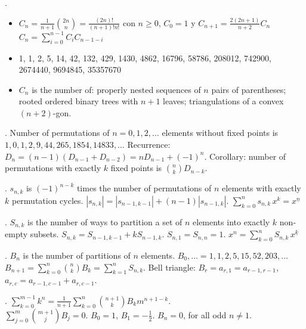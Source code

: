 .
\begin{itemize}
    \item $C_n = \frac{1}{n+1} \binom{2n}{n} = \frac{(2n)!}{(n+1)!n!}$ con $n \geq 0$, $C_0 = 1$ y $C_{n+1} = \frac{2(2n + 1)}{n + 2} C_{n}$
$C_n=\sum_{i=0}^{n-1} C_i C_{n-1-i}$    
\item 1, 1, 2, 5, 14, 42, 132, 429, 1430, 4862, 16796, 58786, 208012, 742900, 2674440, 9694845, 35357670
 \item $C_n$ is the number of:
properly nested sequences of $n$ pairs of parentheses;
rooted ordered binary trees with $n+1$ leaves;
triangulations of a convex $(n+2)$-gon.

\end{itemize}

.
Number of permutations of $n=0,1,2,\dots$ elements without fixed points is
$1, 0, 1, 2, 9, 44, 265, 1854, 14833, \dots$
Recurrence: $D_n = (n-1)(D_{n-1} + D_{n-2}) = n D_{n-1} + (-1)^n$.
Corollary: number of permutations with exactly $k$ fixed points is ${n \choose k} D_{n-k}$.

.
$s_{n,k}$ is $(-1)^{n-k}$ times the number of permutations of $n$ elements with
exactly $k$ permutation cycles.
$|s_{n,k}| = |s_{n-1,k-1}| + (n-1) |s_{n-1,k}|$. \quad
$\sum_{k=0}^n s_{n,k}\,x^k = x^{\underline n}$


.
$S_{n,k}$ is the number of ways to partition a set of $n$ elements into
exactly $k$ non-empty subsets.
$S_{n,k} = S_{n-1,k-1} + k S_{n-1,k}$.
$S_{n,1} = S_{n,n} = 1$.
$x^n = \sum_{k=0}^n S_{n,k}\,x^{\underline k}$

.
$B_n$ is the number of partitions of $n$ elements.
$B_0, \ldots = 1,1,2,5,15,52,203,\ldots$ \\
$B_{n+1} = \sum_{k=0}^n {n \choose k} B_k = \sum_{k=1}^n S_{n,k}$.
Bell triangle: $B_r=a_{r,1}=a_{r-1,r-1}$, $a_{r,c}=a_{r-1,c-1}+a_{r,c-1}$.

.
$\sum_{k=0}^{m-1} k^n =
\frac{1}{n+1} \sum_{k=0}^n {n+1 \choose k} B_k m^{n+1-k}$. \\
$\sum_{j=0}^m {m+1 \choose j} B_j = 0$.
\quad $B_0=1$, $B_1=-\frac{1}{2}$. $B_n=0$, for all odd $n \ne 1$.

